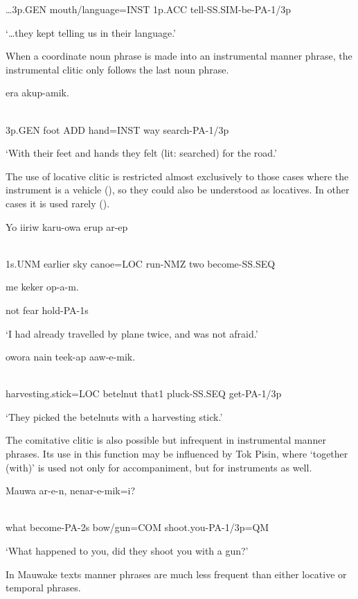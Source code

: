 {\dots}3p.GEN  mouth/language=INST  1p.ACC  tell-SS.SIM-be-PA-1/3p

`{\dots}they kept telling us in their language.'

When a coordinate noun phrase is made into an instrumental manner phrase, the instrumental clitic only follows the last noun phrase.

\ea%
\label{ex:x892}
\gll {} era akup-amik. \\
      \\
\glt
\z

3p.GEN foot ADD hand=INST way search-PA-1/3p

`With their feet and hands they felt (lit: searched) for the road.'

The use of locative clitic is restricted almost exclusively to those cases where the instrument is a vehicle (), so they could also be understood as locatives. In other cases it is used rarely ().

\ea%
\label{ex:x887}
\gll Yo  iiriw    karu-owa  erup  ar-ep  \\
      \\
\glt
\z

1s.UNM  earlier  sky  canoe=LOC  run-NMZ  two  become-SS.SEQ

me  keker  op-a-m.

not  fear  hold-PA-1s

`I had already travelled by plane twice, and was not afraid.'

\ea%
\label{ex:x888}
\gll {}  owora  nain  teek-ap  aaw-e-mik. \\
      \\
\glt
\z

harvesting.stick=LOC  betelnut  that1  pluck-SS.SEQ  get-PA-1/3p

`They picked the betelnuts with a harvesting stick.'

The comitative clitic is also possible but infrequent in instrumental manner phrases. Its use in this function may be influenced by Tok Pisin, where  `together (with)' is used not only for accompaniment, but for instruments as well.

\ea%
\label{ex:x890}
\gll Mauwa  ar-e-n,    nenar-e-mik=i? \\
      \\
\glt
\z

what  become-PA-2s  bow/gun=COM  shoot.you-PA-1/3p=QM

`What happened to you, did they shoot you with a gun?'

In Mauwake texts manner phrases are much less frequent than either locative or temporal phrases.

